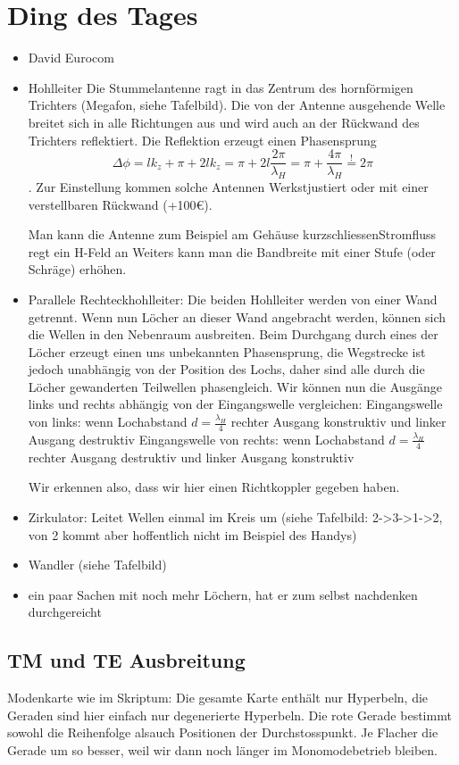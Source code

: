 \documentclass[a4paper]{article}
\begin{document}
\section*{Ding des Tages}
\begin{itemize}
\item David Eurocom
\item Hohlleiter
    Die Stummelantenne ragt in das Zentrum des hornförmigen Trichters (Megafon, siehe Tafelbild). Die von der Antenne ausgehende Welle breitet sich in alle Richtungen aus und wird auch an der Rückwand des Trichters reflektiert. Die Reflektion erzeugt einen Phasensprung
    \[ \Delta\phi=lk_{z} +\pi+2lk_{z}=\pi+2l \frac{2\pi}{\lambda_{H}}=\pi+\frac{4\pi}{\lambda_{H}}\overset{!}{=}2\pi \].
    Zur Einstellung kommen solche Antennen Werkstjustiert oder mit einer verstellbaren Rückwand (+100€).
    
    Man kann die Antenne zum Beispiel am Gehäuse kurzschliessen\implies Stromfluss regt ein H-Feld an\newline
    Weiters kann man die Bandbreite mit einer Stufe (oder Schräge) erhöhen.
\item Parallele Rechteckhohlleiter:
    Die beiden Hohlleiter werden von einer Wand getrennt. Wenn nun Löcher an dieser Wand angebracht werden, können sich die Wellen in den Nebenraum ausbreiten. Beim Durchgang durch eines der Löcher erzeugt einen uns unbekannten Phasensprung, die Wegstrecke ist jedoch unabhängig von der Position des Lochs, daher sind alle durch die Löcher gewanderten Teilwellen phasengleich. Wir können nun die Ausgänge links und rechts abhängig von der Eingangswelle vergleichen:
    Eingangswelle von links: wenn Lochabstand $d=\frac{\lambda_{H}}{4}$ \implies rechter Ausgang konstruktiv und linker Ausgang destruktiv
    Eingangswelle von rechts: wenn Lochabstand $d=\frac{\lambda_{H}}{4}$ \implies rechter Ausgang destruktiv und linker Ausgang konstruktiv 

    Wir erkennen also, dass wir hier einen Richtkoppler gegeben haben.

\item Zirkulator: Leitet Wellen einmal im Kreis um (siehe Tafelbild: 2->3->1->2, von 2 kommt aber hoffentlich nicht im Beispiel des Handys)
\item Wandler (siehe Tafelbild)
\item ein paar Sachen mit noch mehr Löchern, hat er zum selbst nachdenken durchgereicht
\end{itemize}

\subsection*{TM und TE Ausbreitung}
Modenkarte wie im Skriptum:
Die gesamte Karte enthält nur Hyperbeln, die Geraden sind hier einfach nur degenerierte Hyperbeln.
Die rote Gerade bestimmt sowohl die Reihenfolge alsauch Positionen der Durchstosspunkt.
Je Flacher die Gerade um so besser, weil wir dann noch länger im Monomodebetrieb bleiben.
\end{document}
